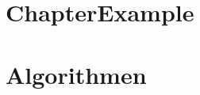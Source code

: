 \documentclass[12pt,oneside]{book}
\begin{document}
	
	
	\tableofcontents
	\clearpage

	\chapter{ChapterExample}
	

	\chapter{Algorithmen}
	
\end{document}
